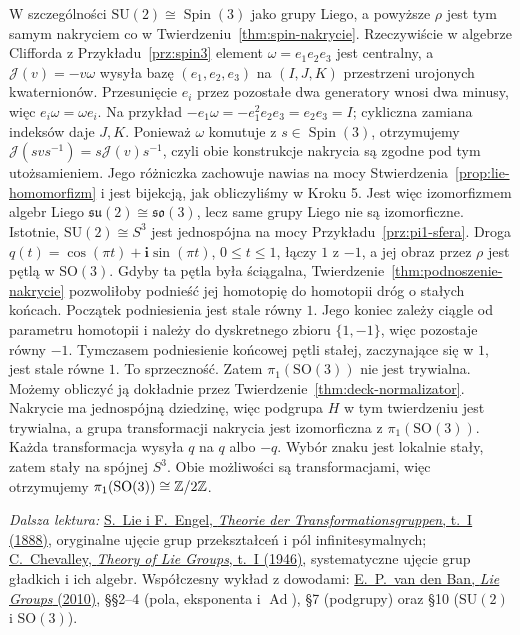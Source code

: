 W szczególności $\mathrm{SU}(2)\cong\operatorname{Spin}(3)$
jako grupy Liego, a powyższe $\rho$ jest tym samym
nakryciem co w Twierdzeniu~\ref{thm:spin-nakrycie}.
Rzeczywiście w algebrze Clifforda z
Przykładu~\ref{prz:spin3} element
$\omega=e_1e_2e_3$ jest centralny, a
$\mathcal J(v)=-v\omega$ wysyła bazę $(e_1,e_2,e_3)$ na
$(I,J,K)$ przestrzeni urojonych kwaternionów.
Przesunięcie $e_i$ przez pozostałe dwa generatory wnosi
dwa minusy, więc $e_i\omega=\omega e_i$.
Na przykład $-e_1\omega=-e_1^2e_2e_3=e_2e_3=I$;
cykliczna zamiana indeksów daje $J,K$.
Ponieważ $\omega$ komutuje z $s\in\operatorname{Spin}(3)$,
otrzymujemy $\mathcal J(svs^{-1})=s\mathcal J(v)s^{-1}$, czyli obie
konstrukcje nakrycia są zgodne pod tym utożsamieniem.
Jego różniczka zachowuje nawias na mocy
Stwierdzenia~\ref{prop:lie-homomorfizm} i jest bijekcją,
jak obliczyliśmy w Kroku 5. Jest więc izomorfizmem algebr Liego
$\mathfrak{su}(2)\cong\mathfrak{so}(3)$, lecz same grupy
Liego nie są izomorficzne. Istotnie,
$\mathrm{SU}(2)\cong S^3$ jest jednospójna na mocy
Przykładu~\ref{prz:pi1-sfera}. Droga
$q(t)=\cos(\pi t)+\mathbf i\sin(\pi t)$, $0\leq t\leq1$,
łączy $1$ z $-1$, a jej obraz przez $\rho$ jest pętlą
w $\mathrm{SO}(3)$. Gdyby ta pętla była ściągalna,
Twierdzenie~\ref{thm:podnoszenie-nakrycie} pozwoliłoby
podnieść jej homotopię do homotopii dróg o stałych
końcach. Początek podniesienia jest stale równy $1$.
Jego koniec zależy ciągle od parametru homotopii i należy
do dyskretnego zbioru $\{1,-1\}$, więc pozostaje równy $-1$.
Tymczasem podniesienie końcowej pętli stałej, zaczynające się
w $1$, jest stale równe $1$. To sprzeczność.
Zatem $\pi_1(\mathrm{SO}(3))$ nie jest trywialna.
Możemy obliczyć ją dokładnie przez
Twierdzenie~\ref{thm:deck-normalizator}.
Nakrycie ma jednospójną dziedzinę, więc podgrupa $H$
w tym twierdzeniu jest trywialna, a grupa transformacji
nakrycia jest izomorficzna z $\pi_1(\mathrm{SO}(3))$.
Każda transformacja wysyła $q$ na $q$ albo $-q$.
Wybór znaku jest lokalnie stały, zatem stały na spójnej $S^3$.
Obie możliwości są transformacjami, więc otrzymujemy
$\pi_1(\mathrm{SO}(3))\cong\mathbb{Z}/2\mathbb{Z}$.

\par\smallskip
{\footnotesize\noindent\emph{Dalsza lektura:}
\href{https://archive.org/download/theotransformation01liesrich/theotransformation01liesrich.pdf}
{S.\ Lie i F.\ Engel, \emph{Theorie der Transformationsgruppen},
t.~I (1888)}, oryginalne ujęcie grup przekształceń i pól
infinitesymalnych;
\href{https://books.google.com/books/about/Theory_of_Lie_Groups_I.html?id=bm4GAQAAIAAJ}
{C.\ Chevalley, \emph{Theory of Lie Groups}, t.~I (1946)},
systematyczne ujęcie grup gładkich i ich algebr.
Współczesny wykład z dowodami:
\href{https://www.staff.science.uu.nl/~ban00101/lecnotes/lie2010.pdf}
{E.\ P.\ van den Ban, \emph{Lie Groups} (2010)},
§§2--4 (pola, eksponenta i $\operatorname{Ad}$), §7 (podgrupy)
oraz §10 ($\mathrm{SU}(2)$ i $\mathrm{SO}(3)$).\par}
